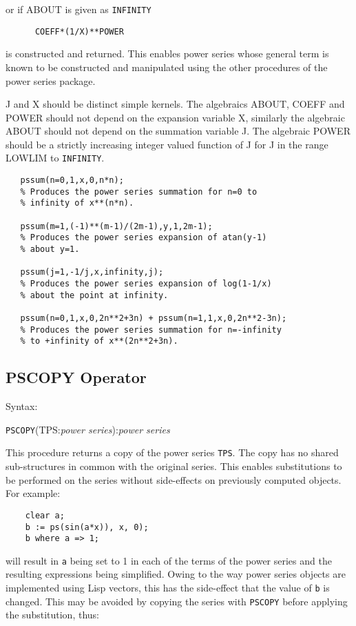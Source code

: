 or if ABOUT is given as {\tt INFINITY}

\begin{verbatim}
      COEFF*(1/X)**POWER
\end{verbatim}

is constructed and returned. This enables power series whose general
term is known to be constructed and manipulated using the other
procedures of the power series package. 

J and X should be distinct simple kernels. The algebraics
ABOUT,  COEFF and POWER should not depend on the
expansion variable X, similarly the algebraic ABOUT should
not depend on the summation variable J.  The algebraic POWER should be
a strictly increasing integer valued function of J for J in the range
LOWLIM to {\tt INFINITY}.

\begin{verbatim}
   pssum(n=0,1,x,0,n*n);
   % Produces the power series summation for n=0 to
   % infinity of x**(n*n).

   pssum(m=1,(-1)**(m-1)/(2m-1),y,1,2m-1);
   % Produces the power series expansion of atan(y-1)
   % about y=1.

   pssum(j=1,-1/j,x,infinity,j);
   % Produces the power series expansion of log(1-1/x)
   % about the point at infinity.

   pssum(n=0,1,x,0,2n**2+3n) + pssum(n=1,1,x,0,2n**2-3n);
   % Produces the power series summation for n=-infinity
   % to +infinity of x**(2n**2+3n).
\end{verbatim}

\subsection{PSCOPY Operator}

Syntax:

\hspace*{2em} {\tt PSCOPY}(TPS:{\em power series}):{\em power series}

This procedure returns a copy of the power series {\tt TPS}. The copy
has no shared sub-structures in common with the original series.  This
enables substitutions to be performed on the series without
side-effects on previously computed objects. For example:

\begin{verbatim}
    clear a;
    b := ps(sin(a*x)), x, 0);
    b where a => 1;
\end{verbatim}

will result in {\tt a} being set to 1 in each of the terms of the
power series and the resulting expressions being simplified. Owing to
the way power series objects are implemented using Lisp vectors, this
has the side-effect that the value of {\tt b} is changed.  This may be
avoided by copying the series with {\tt PSCOPY} before applying the
substitution, thus:

